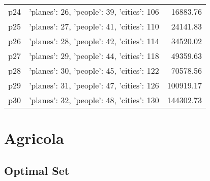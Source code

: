 \documentclass{article}
\begin{document}
\begin{center}
\begin{tabular}{@{}l|r|r@{}}
  p24&{'planes': 26, 'people': 39, 'cities': 106}&16883.76\\
  p25&{'planes': 27, 'people': 41, 'cities': 110}&24141.83\\
  p26&{'planes': 28, 'people': 42, 'cities': 114}&34520.02\\
  p27&{'planes': 29, 'people': 44, 'cities': 118}&49359.63\\
  p28&{'planes': 30, 'people': 45, 'cities': 122}&70578.56\\
  p29&{'planes': 31, 'people': 47, 'cities': 126}&100919.17\\
  p30&{'planes': 32, 'people': 48, 'cities': 130}&144302.73
                            \end{tabular}
                            \end{center}
                    
                            \newpage \section{Agricola}
                    \subsection*{Optimal Set}
                    
\end{document}
